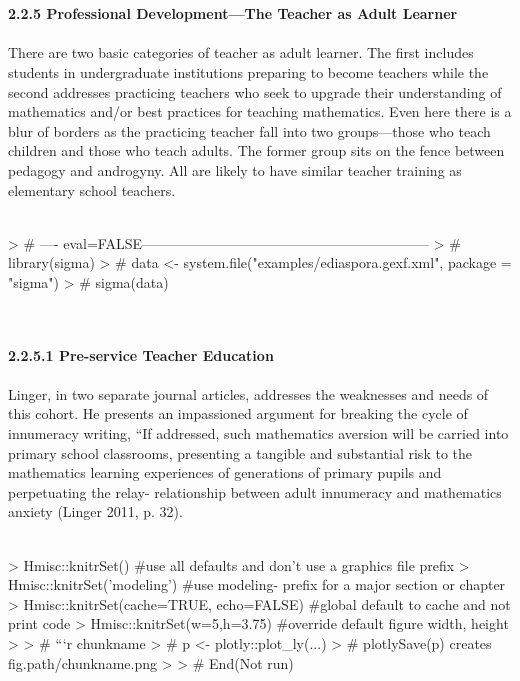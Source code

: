 \documentclass{article}
\begin{document}
\textit{\\\\}
\textbf{ 2.2.5 Professional Development—The Teacher as Adult Learner }
\textit{\\\\}
 There are two basic categories of teacher as adult learner. The first includes students
 in undergraduate institutions preparing to become teachers while the second addresses
 practicing teachers who seek to upgrade their understanding of mathematics and/or
 best practices for teaching mathematics. Even here there is a blur of borders as the
 practicing teacher fall into two groups—those who teach children and those who
 teach adults. The former group sits on the fence between pedagogy and androgyny.
 All are likely to have similar teacher training as elementary school teachers.
\textit{\\\\}
\begin{Schunk}
\begin{Sinput}
> # ---- eval=FALSE--------------------------------------------------------------
> #  library(sigma)
> #  data <- system.file("examples/ediaspora.gexf.xml", package = "sigma")
> #  sigma(data)
\end{Sinput}
\end{Schunk}
\textit{\\\\}
\textbf{ 2.2.5.1 Pre-service Teacher Education }
\textit{\\\\} 
 Linger, in two separate journal articles, addresses the weaknesses and needs of this
 cohort. He presents an impassioned argument for breaking the cycle of innumeracy
 writing, “If addressed, such mathematics aversion will be carried into primary
 school classrooms, presenting a tangible and substantial risk to the mathematics
 learning experiences of generations of primary pupils and perpetuating the relay-
   relationship between adult innumeracy and mathematics anxiety (Linger 2011, p. 32).
\textit{\\\\}
\begin{Schunk}
\begin{Sinput}
> Hmisc::knitrSet()     #use all defaults and don't use a graphics file prefix
> Hmisc::knitrSet('modeling')    #use modeling- prefix for a major section or chapter
> Hmisc::knitrSet(cache=TRUE, echo=FALSE)   #global default to cache and not print code
> Hmisc::knitrSet(w=5,h=3.75)    #override default figure width, height
> 
> # ```{r chunkname}
> # p <- plotly::plot_ly(...)
> # plotlySave(p)    creates fig.path/chunkname.png
> 
> # End(Not run)
\end{Sinput}
\end{Schunk}
\end{document}
